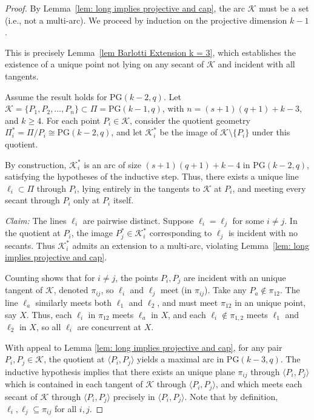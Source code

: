 \documentclass[10pt,a4paper]{amsart}
\newcommand{\K}{\mathcal{K}}
\begin{document}
\begin{proof}
	By Lemma~\ref{lem: long implies projective and cap}, the arc \( \K \) must be a set (i.e., not a multi-arc). We proceed by induction on the projective dimension \( k - 1 \).
	
	\smallskip
	\noindent {} This is precisely Lemma~\ref{lem Barlotti Extension k = 3}, which establishes the existence of a unique point not lying on any secant of \( \K \) and incident with all tangents.
	
	\smallskip
	Assume the result holds for PG\((k-2, q)\). Let \( \K = \{P_1, P_2, \ldots, P_n\} \subset \Pi = \text{PG}(k-1, q) \), with \( n = (s+1)(q+1) + k - 3 \), and \( k \ge 4 \). For each point \( P_i \in \K \), consider the quotient geometry \( \Pi^*_i = \Pi / P_i \cong \text{PG}(k - 2, q) \), and let \( \K_i^* \) be the image of \( \K \setminus \{P_i\} \) under this quotient.
	
	By construction, \( \K_i^* \) is an arc of size \( (s+1)(q+1) + k - 4 \) in PG\((k - 2, q)\), satisfying the hypotheses of the inductive step. Thus, there exists a unique line \( \ell_i \subset \Pi \) through \( P_i \), lying entirely in the tangents to \( \K \) at \( P_i \), and meeting every secant through \( P_i \) only at \( P_i \) itself.
	
	\smallskip
	\noindent \textit{Claim:} The lines \( \ell_i \) are pairwise distinct. Suppose \( \ell_i = \ell_j \) for some \( i \ne j \). In the quotient at \( P_i \), the image \( P_j^* \in \K_i^* \) corresponding to $\ell_j$ is incident with no secants. Thus $\K_i^*$ admits an extension to a multi-arc, violating Lemma~\ref{lem: long implies projective and cap}. 
	
	\smallskip
	\noindent {} Counting shows that for $i\ne j$, the points $P_i,P_j$ are incident with an unique tangent of $\K$, denoted $\pi_{ij}$, so $\ell_i$ and $\ell_j$ meet (in $\pi_{ij}$). Take any $P_a \notin \pi_{12}$. The line $\ell_a$ similarly meets both $\ell_1$ and $\ell_2$, and must meet $\pi_{12}$ in an unique point, say $X$.  Thus, each $\ell_i$ in $\pi_{12}$ meets $\ell_a$ in $X$, and each $\ell_i\notin \pi_{1,2}$ meets $\ell_1$ and $\ell_2$ in $X$, so all \( \ell_i \) are concurrent at \( X \).
	
	\smallskip
	\noindent {} With appeal to Lemma \ref{lem: long implies projective and cap}, for any pair \( P_i, P_j \in \K \), the quotient at \( \langle P_i, P_j \rangle \) yields a maximal arc in PG\((k-3, q)\). The inductive hypothesis implies that  there exists an unique plane $\pi_{ij}$ through $\langle P_i,P_j\rangle $ which is contained in each tangent of $\K$ through $\langle P_i,P_j\rangle $, and which meets each secant of $\K$ through $\langle P_i,P_j\rangle $ precisely in $\langle P_i,P_j\rangle $.  Note that by definition, $\ell_i,\ell_j \subseteq \pi_{ij}$ for all $i,j$.	
	

\end{proof}
\end{document}
